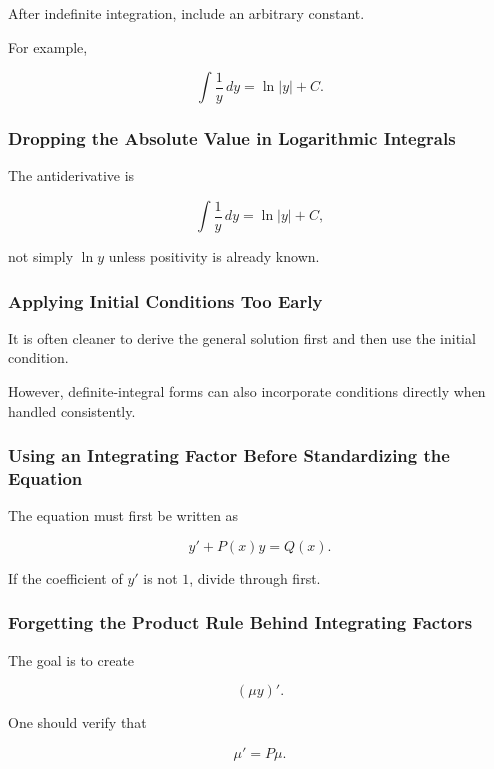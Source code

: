 After indefinite integration, include an arbitrary constant.

For example,

\[
\int
\frac1y\,dy
=
\ln|y|+C.
\]

\subsubsection{Dropping the Absolute Value in Logarithmic Integrals}

The antiderivative is

\[
\boxed{
\int
\frac1y\,dy
=
\ln|y|+C,
}
\]

not simply \(\ln y\) unless positivity is already known.

\subsubsection{Applying Initial Conditions Too Early}

It is often cleaner to derive the general solution first and then use the
initial condition.

However, definite-integral forms can also incorporate conditions
directly when handled consistently.

\subsubsection{Using an Integrating Factor Before Standardizing the Equation}

The equation must first be written as

\[
\boxed{
y'+P(x)y=Q(x).
}
\]

If the coefficient of \(y'\) is not \(1\), divide through first.

\subsubsection{Forgetting the Product Rule Behind Integrating Factors}

The goal is to create

\[
\boxed{
(\mu y)'.
}
\]

One should verify that

\[
\mu'
=
P\mu.
\]

